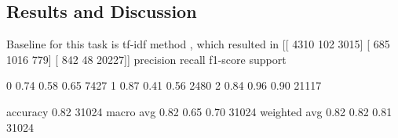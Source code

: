 \subsection{Results and Discussion}





Baseline for this task is tf-idf method %
, which resulted in 
[[ 4310   102  3015]
 [  685  1016   779]
 [  842    48 20227]]
              precision    recall  f1-score   support

           0       0.74      0.58      0.65      7427
           1       0.87      0.41      0.56      2480
           2       0.84      0.96      0.90     21117

    accuracy                           0.82     31024
   macro avg       0.82      0.65      0.70     31024
weighted avg       0.82      0.82      0.81     31024


